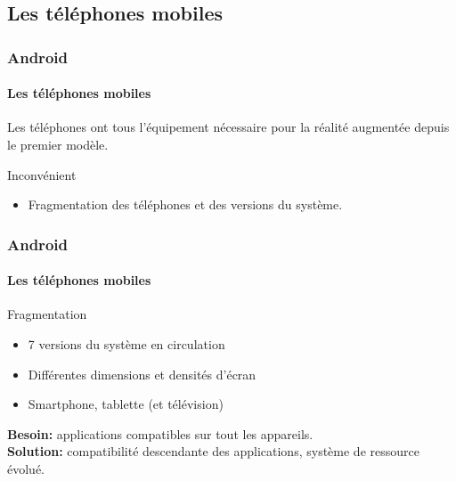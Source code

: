 \subsection{Les téléphones mobiles}

\begin{frame}
\frametitle{Android}
\framesubtitle{Les téléphones mobiles}
Les téléphones ont tous l'équipement nécessaire pour la réalité augmentée depuis le premier modèle.\\
\begin{block}{Inconvénient}
\begin{itemize}
	\item Fragmentation des téléphones et des versions du système.
\end{itemize}
\end{block}
\end{frame}

\begin{frame}
\frametitle{Android}
\framesubtitle{Les téléphones mobiles}
\begin{block}{Fragmentation}
\begin{itemize}
	\item 7 versions du système en circulation
	\item Différentes dimensions et densités d'écran
	\item Smartphone, tablette (et télévision)
\end{itemize}
\end{block}
\textbf{Besoin:} applications compatibles sur tout les appareils.\\
\textbf{Solution:} compatibilité descendante des applications, système de ressource évolué.
\end{frame}




